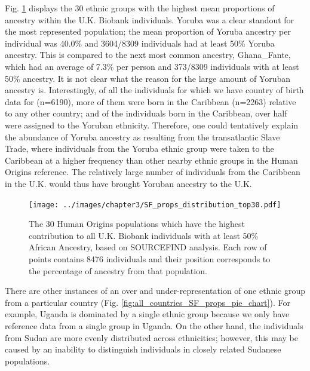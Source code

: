 Fig. \ref{fig:SF_props_distribution_top30} displays the 30 ethnic groups with the highest mean proportions of ancestry within the U.K. Biobank individuals. Yoruba was a clear standout for the most represented population; the mean proportion of Yoruba ancestry per individual was 40.0\% and 3604/8309 individuals had at least 50\% Yoruba ancestry. This is compared to the next most common ancestry, Ghana\_Fante, which had an average of 7.3\% per person and 373/8309 individuals with at least 50\% ancestry. It is not clear what the reason for the large amount of Yoruban ancestry is. Interestingly, of all the individuals for which we have country of birth data for (n=6190), more of them were born in the Caribbean (n=2263) relative to any other country; and of the individuals born in the Caribbean, over half were assigned to the Yoruban ethnicity. Therefore, one could tentatively explain the abundance of Yoruba ancestry as resulting from the transatlantic Slave Trade, where individuals from the Yoruba ethnic group were taken to the Caribbean at a higher frequency than other nearby ethnic groups in the Human Origins reference. The relatively large number of individuals from the Caribbean in the U.K. would thus have brought Yoruban ancestry to the U.K. 

\begin{figure}[htp]
    \centering
    \texttt{[image: ../images/chapter3/SF\_props\_distribution\_top30.pdf]}
    \caption{The 30 Human Origins populations which have the highest contribution to all U.K. Biobank individuals with at least 50\% African Ancestry, based on SOURCEFIND analysis. Each row of points contains 8476 individuals and their position corresponds to the percentage of ancestry from that population. }
    \label{fig:SF_props_distribution_top30}
\end{figure}

There are other instances of an over and under-representation of one ethnic group from a particular country (Fig. \ref{fig:all_countries_SF_props_pie_chart}). For example, Uganda is dominated by a single ethnic group because we only have reference data from a single group in Uganda. On the other hand, the individuals from Sudan are more evenly distributed across ethnicities; however, this may be caused by an inability to distinguish individuals in closely related Sudanese populations. 

